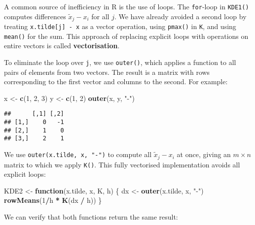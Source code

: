 \documentclass[
  a4paper,
]{article}
\newenvironment{Shaded}{\begin{snugshade}}{\end{snugshade}}
\newcommand{\ControlFlowTok}[1]{\textcolor[rgb]{0.13,0.29,0.53}{\textbf{#1}}}
\newcommand{\DecValTok}[1]{\textcolor[rgb]{0.00,0.00,0.81}{#1}}
\newcommand{\FunctionTok}[1]{\textcolor[rgb]{0.13,0.29,0.53}{\textbf{#1}}}
\newcommand{\NormalTok}[1]{#1}
\newcommand{\OtherTok}[1]{\textcolor[rgb]{0.56,0.35,0.01}{#1}}
\newcommand{\SpecialCharTok}[1]{\textcolor[rgb]{0.81,0.36,0.00}{\textbf{#1}}}
\newcommand{\StringTok}[1]{\textcolor[rgb]{0.31,0.60,0.02}{#1}}
\theoremstyle{definition}
\theoremstyle{definition}
\theoremstyle{definition}
\theoremstyle{definition}
\theoremstyle{remark}
\begin{document}
A common source of inefficiency in R is the use of loops.
The \texttt{for}-loop in \texttt{KDE1()} computes differences \(\tilde x_j - x_i\) for all \(j\).
We have already avoided a second loop by treating \texttt{x.tilde{[}j{]}\ -\ x} as a vector
operation, using \texttt{pmax()} in \texttt{K}, and using \texttt{mean()} for the sum. This approach
of replacing explicit loops with operations on entire vectors is called \textbf{vectorisation}.

To eliminate the loop over \texttt{j}, we use \texttt{outer()}, which applies a function to all
pairs of elements from two vectors. The result is a matrix with rows corresponding
to the first vector and columns to the second. For example:

\begin{Shaded}
\begin{Highlighting}[]
\NormalTok{x }\OtherTok{\textless{}{-}} \FunctionTok{c}\NormalTok{(}\DecValTok{1}\NormalTok{, }\DecValTok{2}\NormalTok{, }\DecValTok{3}\NormalTok{)}
\NormalTok{y }\OtherTok{\textless{}{-}} \FunctionTok{c}\NormalTok{(}\DecValTok{1}\NormalTok{, }\DecValTok{2}\NormalTok{)}
\FunctionTok{outer}\NormalTok{(x, y, }\StringTok{"{-}"}\NormalTok{)}
\end{Highlighting}
\end{Shaded}

\begin{verbatim}
##      [,1] [,2]
## [1,]    0   -1
## [2,]    1    0
## [3,]    2    1
\end{verbatim}

We use \texttt{outer(x.tilde,\ x,\ "-")} to compute all \(\tilde x_j - x_i\) at once,
giving an \(m \times n\) matrix to which we apply \texttt{K()}. This fully vectorised
implementation avoids all explicit loops:

\begin{Shaded}
\begin{Highlighting}[]
\NormalTok{KDE2 }\OtherTok{\textless{}{-}} \ControlFlowTok{function}\NormalTok{(x.tilde, x, K, h) \{}
\NormalTok{  dx }\OtherTok{\textless{}{-}} \FunctionTok{outer}\NormalTok{(x.tilde, x, }\StringTok{"{-}"}\NormalTok{)}
  \FunctionTok{rowMeans}\NormalTok{(}\DecValTok{1}\SpecialCharTok{/}\NormalTok{h }\SpecialCharTok{*} \FunctionTok{K}\NormalTok{(dx }\SpecialCharTok{/}\NormalTok{ h))}
\NormalTok{\}}
\end{Highlighting}
\end{Shaded}

We can verify that both functions return the same result:
\end{document}
